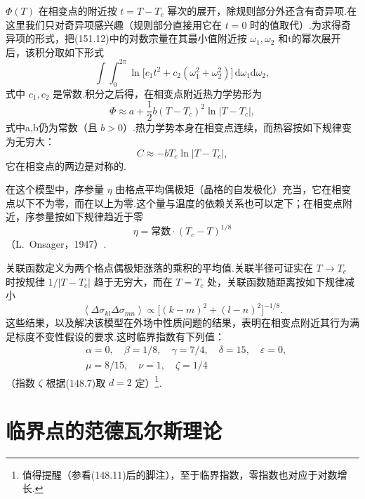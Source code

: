 $\Phi(T)$ 在相变点的附近按 $t=T-T_c$ 幂次的展开，除规则部分外还含有奇异项.在这里我们只对奇异项感兴趣（规则部分直接用它在 $t=0$ 时的值取代）.为求得奇异项的形式，把(151.12)中的对数宗量在其最小值附近按 $\omega_1,\omega_2$ 和t的幂次展开后，该积分取如下形式
\begin{equation*}
  \int\!\!\!\int_0^{2\pi}
  \ln\bigl[c_1t^2+c_2(\omega_1^2+\omega_2^2)\bigr]\,
  \mathrm{d}\omega_1\mathrm{d}\omega_2,
\end{equation*}
式中 $c_1,c_2$ 是常数.积分之后得，在相变点附近热力学势形为
\begin{equation}
  \Phi\approx a+\frac{1}{2}b(T-T_c)^2\ln\left|T-T_c\right|,
\end{equation}
式中a,b仍为常数（且 $b>0$）.热力学势本身在相变点连续，而热容按如下规律变为无穷大：
\begin{equation}
  C\approx-bT_c\ln\left|T-T_c\right|,
\end{equation}
它在相变点的两边是对称的.

在这个模型中，序参量 $\eta$ 由格点平均偶极矩（晶格的自发极化）充当，它在相变点以下不为零，而在以上为零.这个量与温度的依赖关系也可以定下；在相变点附近，序参量按如下规律趋近于零
\begin{equation}
  \eta=\text{常数}\cdot(T_c-T)^{1/8}
\end{equation}
（L.~Onsager，1947）.

关联函数定义为两个格点偶极矩涨落的乘积的平均值.关联半径可证实在 $T\to T_c$ 时按规律 $1/\left|T-T_c\right|$ 趋于无穷大，而在 $T=T_c$ 处，关联函数随距离按如下规律减小
\begin{equation*}
  \left\langle\Delta\sigma_{kl}\Delta\sigma_{mn}\right\rangle
  \propto\bigl[(k-m)^2+(l-n)^2\bigr]^{-1/8}.
\end{equation*}
这些结果，以及解决该模型在外场中性质问题的结果，表明在相变点附近其行为满足标度不变性假设的要求.这时临界指数有下列值：
\begin{equation}
\begin{aligned}
  &\alpha=0,\quad\beta=1/8,\quad\gamma=7/4,\quad\delta=15,\quad\varepsilon=0,\\
  &\mu=8/15,\quad\nu=1,\quad\zeta=1/4
\end{aligned}
\end{equation}
（指数 $\zeta$ 根据(148.7)取 $d=2$ 定）\footnote{值得提醒（参看(148.11)后的脚注），至于临界指数，零指数也对应于对数增长.}.

\section{临界点的范德瓦尔斯理论}

